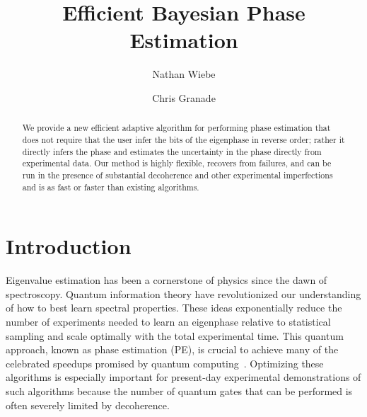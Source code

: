 \documentclass[aps,pra,amsmath,twocolumn,amssymb,superscriptaddress]{revtex4-1}
\begin{document}

\title{Efficient Bayesian Phase Estimation}
\author{Nathan Wiebe}

\author{Chris Granade}

\begin{abstract}
    We provide a new efficient adaptive algorithm for performing phase
    estimation that does not require that the user infer the bits of the
    eigenphase in reverse order; rather it directly infers the phase and
    estimates the uncertainty in the phase directly from experimental data. Our
    method is highly flexible, recovers from failures, and can be run in the
    presence of substantial decoherence and other experimental imperfections
    and is as fast or faster than existing algorithms.
\end{abstract}

\maketitle

\section{Introduction}
\label{sec:intro}


Eigenvalue estimation has been a cornerstone of physics since the dawn of spectroscopy.  Quantum information theory have revolutionized our understanding of how to best learn spectral properties.
These ideas exponentially reduce the number of experiments needed to learn an eigenphase relative to statistical sampling and scale optimally with the total experimental time.
This quantum approach, known as phase estimation (PE), is crucial to achieve many of the celebrated speedups promised by quantum computing~\cite{shor_polynomial-time_1995,BHM+02,ADL+05,harrow2009quantum,lanyon2010towards}.  Optimizing these algorithms is especially important for present-day experimental demonstrations of such algorithms because the number of quantum gates that can be performed is often severely limited by decoherence.
\end{document}
